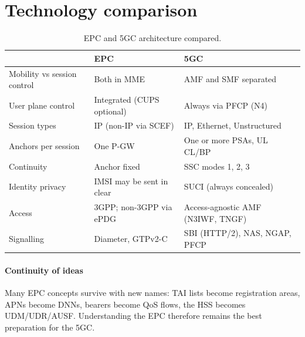 \documentclass[11pt,a4paper]{article}
\begin{document}
\section{Technology comparison}
\begin{table}[htbp]
\centering\small
\caption{EPC and 5GC architecture compared.}\label{tab:cmp}
\begin{tabularx}{\linewidth}{@{}l Y Y@{}}
\toprule
{} & EPC & 5GC \\
\midrule
Mobility vs session control & Both in MME          & AMF and SMF separated \\
User plane control & Integrated (CUPS optional)    & Always via PFCP (N4) \\
Session types      & IP (non-IP via SCEF)          & IP, Ethernet, Unstructured \\
Anchors per session & One P-GW                     & One or more PSAs, UL CL/BP \\
Continuity         & Anchor fixed                  & SSC modes 1, 2, 3 \\
Identity privacy   & IMSI may be sent in clear     & SUCI (always concealed) \\
Access             & 3GPP; non-3GPP via ePDG       & Access-agnostic AMF (N3IWF, TNGF) \\
Signalling         & Diameter, GTPv2-C             & SBI (HTTP/2), NAS, NGAP, PFCP \\
\bottomrule
\end{tabularx}
\end{table}

\paragraph{Continuity of ideas} Many EPC concepts survive with new names: TAI lists become registration areas, APNs become DNNs, bearers
become QoS flows, the HSS becomes UDM/UDR/AUSF. Understanding the EPC therefore remains the best preparation for the 5GC.

\end{document}
